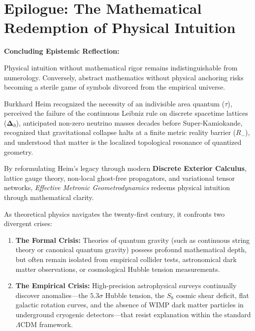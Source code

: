 \documentclass[
    12pt,
    a4paper,
    headings=normal,
    twoside=false,
    open=any,
    parskip=half
]{scrbook}
\newcommand{\ethop}{\eth}
\begin{document}
\chapter*{Epilogue: The Mathematical Redemption of Physical Intuition}

\begin{firewallbox}
\textbf{Concluding Epistemic Reflection:}\par\smallskip\noindent
Physical intuition without mathematical rigor remains indistinguishable from numerology. Conversely, abstract mathematics without physical anchoring risks becoming a sterile game of symbols divorced from the empirical universe.

Burkhard Heim recognized the necessity of an indivisible area quantum ($\tau$), perceived the failure of the continuous Leibniz rule on discrete spacetime lattices ($\mathbf{\Delta}_\ethop$), anticipated non-zero neutrino masses decades before Super-Kamiokande, recognized that gravitational collapse halts at a finite metric reality barrier ($R_-$), and understood that matter is the localized topological resonance of quantized geometry.

By reformulating Heim's legacy through modern \textbf{Discrete Exterior Calculus}, lattice gauge theory, non-local ghost-free propagators, and variational tensor networks, \textit{Effective Metronic Geometrodynamics} redeems physical intuition through mathematical clarity.
\end{firewallbox}

\vspace{1.2em}
\noindent
As theoretical physics navigates the twenty-first century, it confronts two divergent crises:
\begin{enumerate}[label=(\alph*), itemsep=5pt]
    \item \textbf{The Formal Crisis:} Theories of quantum gravity (such as continuous string theory or canonical quantum gravity) possess profound mathematical depth, but often remain isolated from empirical collider tests, astronomical dark matter observations, or cosmological Hubble tension measurements.
    \item \textbf{The Empirical Crisis:} High-precision astrophysical surveys continually discover anomalies---the $5.3\sigma$ Hubble tension, the $S_8$ cosmic shear deficit, flat galactic rotation curves, and the absence of WIMP dark matter particles in underground cryogenic detectors---that resist explanation within the standard $\Lambda\text{CDM}$ framework.
\end{enumerate}
\end{document}
